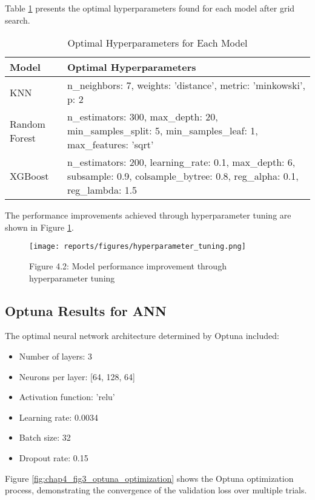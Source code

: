 \documentclass[12pt]{article}
\begin{document}
Table \ref{tab:optimal_hyperparameters} presents the optimal hyperparameters found for each model after grid search.

\begin{table}[h]
\centering
\caption{Optimal Hyperparameters for Each Model}
\label{tab:optimal_hyperparameters}
\begin{tabular}{|l|p{10cm}|}
\hline
\textbf{Model} & \textbf{Optimal Hyperparameters} \\
\hline
KNN & n\_neighbors: 7, weights: 'distance', metric: 'minkowski', p: 2 \\
\hline
Random Forest & n\_estimators: 300, max\_depth: 20, min\_samples\_split: 5, min\_samples\_leaf: 1, max\_features: 'sqrt' \\
\hline
XGBoost & n\_estimators: 200, learning\_rate: 0.1, max\_depth: 6, subsample: 0.9, colsample\_bytree: 0.8, reg\_alpha: 0.1, reg\_lambda: 1.5 \\
\hline
\end{tabular}
\end{table}

The performance improvements achieved through hyperparameter tuning are shown in Figure \ref{fig:chap4_fig2_hyperparameter_tuning}.

\begin{figure}[h]
\centering
\texttt{[image: reports/figures/hyperparameter\_tuning.png]}
\caption{Figure 4.2: Model performance improvement through hyperparameter tuning}
\label{fig:chap4_fig2_hyperparameter_tuning}
\end{figure}

\subsection{Optuna Results for ANN}
\label{subsec:optuna_results}

The optimal neural network architecture determined by Optuna included:
\begin{itemize}
    \item Number of layers: 3
    \item Neurons per layer: [64, 128, 64]
    \item Activation function: 'relu'
    \item Learning rate: 0.0034
    \item Batch size: 32
    \item Dropout rate: 0.15
\end{itemize}

Figure \ref{fig:chap4_fig3_optuna_optimization} shows the Optuna optimization process, demonstrating the convergence of the validation loss over multiple trials.
\end{document}
